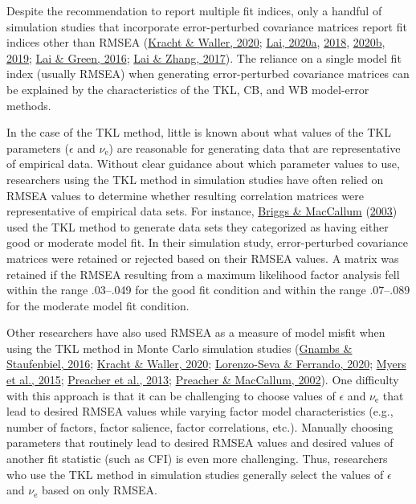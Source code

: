 \documentclass[11pt]{umnthesis}
\begin{document}
Despite the recommendation to report multiple fit indices, only a handful of simulation studies that incorporate error-perturbed covariance matrices report fit indices other than RMSEA (\protect\hyperlink{ref-kracht2020}{Kracht \& Waller, 2020}; \protect\hyperlink{ref-lai2020}{Lai, 2020a}, \protect\hyperlink{ref-lai2018}{2018}, \protect\hyperlink{ref-lai2020b}{2020b}, \protect\hyperlink{ref-lai2019a}{2019}; \protect\hyperlink{ref-lai2016}{Lai \& Green, 2016}; \protect\hyperlink{ref-lai2017}{Lai \& Zhang, 2017}). The reliance on a single model fit index (usually RMSEA) when generating error-perturbed covariance matrices can be explained by the characteristics of the TKL, CB, and WB model-error methods.

In the case of the TKL method, little is known about what values of the TKL parameters (\(\epsilon\) and \(\nu_\textrm{e}\)) are reasonable for generating data that are representative of empirical data. Without clear guidance about which parameter values to use, researchers using the TKL method in simulation studies have often relied on RMSEA values to determine whether resulting correlation matrices were representative of empirical data sets. For instance, \protect\hyperlink{ref-briggs2003}{Briggs \& MacCallum} (\protect\hyperlink{ref-briggs2003}{2003}) used the TKL method to generate data sets they categorized as having either good or moderate model fit. In their simulation study, error-perturbed covariance matrices were retained or rejected based on their RMSEA values. A matrix was retained if the RMSEA resulting from a maximum likelihood factor analysis fell within the range .03--.049 for the good fit condition and within the range .07--.089 for the moderate model fit condition.

Other researchers have also used RMSEA as a measure of model misfit when using the TKL method in Monte Carlo simulation studies (\protect\hyperlink{ref-gnambs2016}{Gnambs \& Staufenbiel, 2016}; \protect\hyperlink{ref-kracht2020}{Kracht \& Waller, 2020}; \protect\hyperlink{ref-lorenzo-seva2020}{Lorenzo-Seva \& Ferrando, 2020}; \protect\hyperlink{ref-myers2015a}{Myers et al., 2015}; \protect\hyperlink{ref-preacher2013}{Preacher et al., 2013}; \protect\hyperlink{ref-preacher2002}{Preacher \& MacCallum, 2002}). One difficulty with this approach is that it can be challenging to choose values of \(\epsilon\) and \(\nu_\textrm{e}\) that lead to desired RMSEA values while varying factor model characteristics (e.g., number of factors, factor salience, factor correlations, etc.). Manually choosing parameters that routinely lead to desired RMSEA values and desired values of another fit statistic (such as CFI) is even more challenging. Thus, researchers who use the TKL method in simulation studies generally select the values of \(\epsilon\) and \(\nu_\textrm{e}\) based on only RMSEA.
\end{document}

